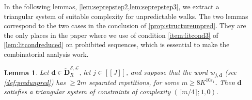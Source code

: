 \documentclass[11pt]{amsart}
\newtheorem{lemma}[theorem]{Lemma}
\theoremstyle{definition}
\renewcommand{\geq}{\geqslant}
\newcommand{\sinterval}[1]{[\![#1]\!] }
\newcommand{\eps}{\varepsilon}
\renewcommand{\d}{\boldsymbol{d}}
\newcommand{\cstm}{10\eps_1}
\newcommand{\lit}{\mathcal{L}}
\newcommand{\s}{\mathcal{S}}
\newcommand{\fancyD}{\mathbf{D}}
\newcommand{\Dnb}{\widetilde{\fancyD}^{\s,\lit}_{\!\tupsize}}
\newcommand{\repK}{K}
\newcommand{\newR}{\sinterval{J}}
\newcommand{\mm}{m}
\newcommand{\tupsize}{R}
\begin{document}
In the following lemmas, \cref{lem:seprepstep2,lem:seprepstep3}, we extract a triangular system of suitable complexity for unpredictable walks. The two lemmas correspond to the two cases in the conclusion of \cref{prop:structureunpred}. They are the only places in the paper where we use of condition \cref{item:litcond3} of \cref{lem:litcondreduced} on prohibited sequences, which is essential to make the combinatorial analysis work. 

\begin{lemma}
\label{lem:seprepstep2}
Let $\d \in \Dnb$, let $j\in \newR$, and suppose that the word $w_{j,\d}$ (see \cref{def:predunpred}) has $\geq 2\mm$ separated repetitions, for some $\mm \geq 8 \repK^{\cstm}$. Then $\d$ satisfies a triangular system of constraints of complexity $(\lceil \mm/4 \rceil;1,0)$.
\end{lemma}
\end{document}
